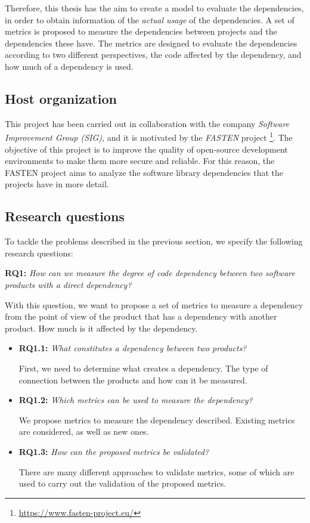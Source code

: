 \blankl
Therefore, this thesis has the aim to create a model to evaluate the dependencies, in order to obtain information of the \textit{actual usage} of the dependencies. A set of metrics is proposed to measure the dependencies between projects and the dependencies these have. The metrics are designed to evaluate the dependencies according to two different perspectives, the code affected by the dependency, and how much of a dependency is used.

\subsection{Host organization}
This project has been carried out in collaboration with the company \textit{Software Improvement Group (SIG)}, and it is motivated by the \textit{FASTEN} project \footnote{\url{https://www.fasten-project.eu/}}. The objective of this project is to improve the quality of open-source development environments to make them more secure and reliable. For this reason, the FASTEN project aims to analyze the software library dependencies that the projects have in more detail.

\subsection{Research questions}
To tackle the problems described in the previous section, we specify the following research questions:

\blankl
\textbf{RQ1:} \textit{How can we measure the degree of code dependency between two software products with a direct dependency?}

\blankls
With this question, we want to propose a set of metrics to measure a dependency from the point of view of the product that has a dependency with another product. How much is it affected by the dependency.

\begin{itemize}
  \item \textbf{RQ1.1:} \textit{What constitutes a dependency between two products?}

  First, we need to determine what creates a dependency. The type of connection between the products and how can it be measured.

  \item \textbf{RQ1.2:} \textit{Which metrics can be used to measure the dependency?}

  We propose metrics to measure the dependency described. Existing metrics are considered, as well as new ones.

  \item \textbf{RQ1.3:} \textit{How can the proposed metrics be validated?}

  There are many different approaches to validate metrics, some of which are used to carry out the validation of the proposed metrics.
\end{itemize}

